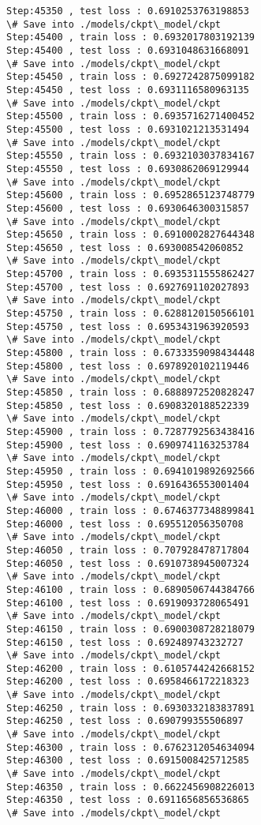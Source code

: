 \documentclass[11pt]{article}
\begin{document}
\begin{Verbatim}[commandchars=\\\{\}]
Step:45350 , test loss : 0.6910253763198853
\# Save into ./models/ckpt\_model/ckpt
Step:45400 , train loss : 0.6932017803192139
Step:45400 , test loss : 0.6931048631668091
\# Save into ./models/ckpt\_model/ckpt
Step:45450 , train loss : 0.6927242875099182
Step:45450 , test loss : 0.6931116580963135
\# Save into ./models/ckpt\_model/ckpt
Step:45500 , train loss : 0.6935716271400452
Step:45500 , test loss : 0.6931021213531494
\# Save into ./models/ckpt\_model/ckpt
Step:45550 , train loss : 0.6932103037834167
Step:45550 , test loss : 0.6930862069129944
\# Save into ./models/ckpt\_model/ckpt
Step:45600 , train loss : 0.6952865123748779
Step:45600 , test loss : 0.6930646300315857
\# Save into ./models/ckpt\_model/ckpt
Step:45650 , train loss : 0.6910002827644348
Step:45650 , test loss : 0.693008542060852
\# Save into ./models/ckpt\_model/ckpt
Step:45700 , train loss : 0.6935311555862427
Step:45700 , test loss : 0.6927691102027893
\# Save into ./models/ckpt\_model/ckpt
Step:45750 , train loss : 0.6288120150566101
Step:45750 , test loss : 0.6953431963920593
\# Save into ./models/ckpt\_model/ckpt
Step:45800 , train loss : 0.6733359098434448
Step:45800 , test loss : 0.6978920102119446
\# Save into ./models/ckpt\_model/ckpt
Step:45850 , train loss : 0.6888972520828247
Step:45850 , test loss : 0.6908320188522339
\# Save into ./models/ckpt\_model/ckpt
Step:45900 , train loss : 0.7287792563438416
Step:45900 , test loss : 0.6909741163253784
\# Save into ./models/ckpt\_model/ckpt
Step:45950 , train loss : 0.6941019892692566
Step:45950 , test loss : 0.6916436553001404
\# Save into ./models/ckpt\_model/ckpt
Step:46000 , train loss : 0.6746377348899841
Step:46000 , test loss : 0.695512056350708
\# Save into ./models/ckpt\_model/ckpt
Step:46050 , train loss : 0.707928478717804
Step:46050 , test loss : 0.6910738945007324
\# Save into ./models/ckpt\_model/ckpt
Step:46100 , train loss : 0.6890506744384766
Step:46100 , test loss : 0.6919093728065491
\# Save into ./models/ckpt\_model/ckpt
Step:46150 , train loss : 0.6900308728218079
Step:46150 , test loss : 0.692489743232727
\# Save into ./models/ckpt\_model/ckpt
Step:46200 , train loss : 0.6105744242668152
Step:46200 , test loss : 0.6958466172218323
\# Save into ./models/ckpt\_model/ckpt
Step:46250 , train loss : 0.6930332183837891
Step:46250 , test loss : 0.690799355506897
\# Save into ./models/ckpt\_model/ckpt
Step:46300 , train loss : 0.6762312054634094
Step:46300 , test loss : 0.6915008425712585
\# Save into ./models/ckpt\_model/ckpt
Step:46350 , train loss : 0.6622456908226013
Step:46350 , test loss : 0.6911656856536865
\# Save into ./models/ckpt\_model/ckpt

\end{Verbatim}
\end{document}
